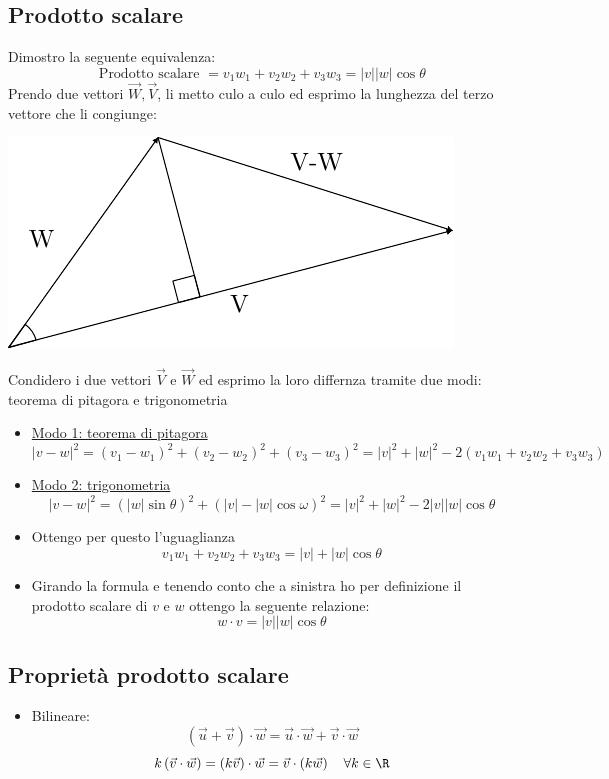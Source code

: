 \documentclass[12pt,a4paper,oneside]{article}
\begin{document}
\subsection{Prodotto scalare}
Dimostro la seguente equivalenza:
\[
	\text{ Prodotto scalare }= v_1 w_1 + v_2 w_2 + v_3w_3 =	\left|v\right|\left|w\right|\cos \theta
\]
Prendo due vettori $ \vec{W}, \vec{V}$, li metto culo a culo ed esprimo la lunghezza del terzo vettore che li congiunge:
\begin{center}
	\includegraphics{Images/Prodotto scalare.pdf}
\end{center}
Condidero i due vettori $ \vec{V} \text{ e } \vec{W}  $ ed esprimo la loro differnza tramite due modi: teorema di pitagora e trigonometria
\begin{itemize}
	\item \underline{Modo 1: teorema di pitagora}
	      \[
		      \left| v-w\right| ^2 = \left( v_1-w_1 \right) ^2 + \left( v_2-w_2 \right) ^2 + \left( v_3-w_3 \right) ^2= \left|v\right|^2 + \left|w\right|^2 - 2\left( v_1w_1 + v_2w_2 + v_3 w_3\right)
	      \]
	\item \underline{Modo 2: trigonometria}
	      \[
		      \left|v-w\right|^2 = \left( \left|w\right| \sin \theta  \right) ^2 + \left( \left|v\right|- \left|w\right| \cos \omega  \right) ^2 = \left|v\right|^2 + \left|w\right|^2 - 2 \left|v\right|\left|w\right|\cos \theta
	      \]
	\item Ottengo per questo l'uguaglianza
	      \[
		      v_1w_1 + v_2w_2 + v_3 w_3 = \left|v\right| + \left|w\right| \cos \theta
	      \]
	\item Girando la formula e tenendo conto che a sinistra ho per definizione il prodotto scalare di $v$ e $w$ ottengo la seguente relazione:
	      \[
		      w \cdot v = \left|v\right|\left|w\right|\cos \theta
	      \]
\end{itemize}
\subsection{Proprietà prodotto scalare}
\begin{itemize}
	\item Bilineare:
	      \[
		      \left( \vec{u} + \vec{v} \right) \cdot \vec{w} = \vec{u} \cdot \vec{w} + \vec{v} \cdot \vec{w}
	      \]
	      \[
		      k\left( \vec{v}\cdot\vec{w} \right) = \left( k\vec{v} \right) \cdot\vec{w} = \vec{v}\cdot \left( k\vec{w} \right) \quad \forall k \in  \R
	      \]
\end{itemize}
\end{document}

